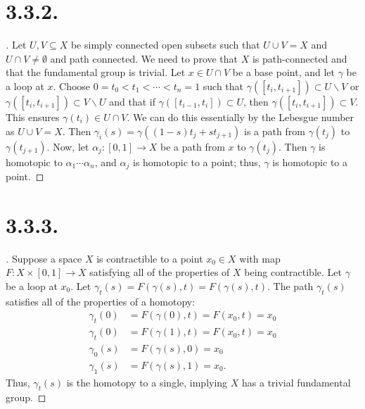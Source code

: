 \documentclass{article}
\begin{document}
\section*{3.3.2.}
\begin{proof}[\unskip\nopunct]
   Let $U, V \subseteq X$ be simply connected open subsets such that $U \cup V = X$ and $U \cap V \neq \emptyset$ 
   and path connected. We need to prove that $X$ is 
   path-connected and that the fundamental group is trivial. Let $x \in U \cap V$ be a base point, and let $\gamma$ be a loop at $x$. Choose $0 = t_0 < t_1 < \cdots < 
   t_n =1$ such that $\gamma([t_i, t_{i + 1}]) \subset U 
   \backslash V$ or $\gamma([t_i, t_{i + 1}]) \subset V 
   \backslash U$ and that if $\gamma([t_{i - 1}, t_i]) \subset U$, then $\gamma([t_i, t_{i + 1}]) \subset V$. 
   This ensures $\gamma(t_i) \in U \cap V$. We can do this essentially by the Lebesgue number as $U \cup V = X$. 
    Then $\gamma_i(s) = \gamma((1 -s)t_j + st_{j + 1})$ is a path from $\gamma(t_j)$ to $\gamma(t_{j + 1})$.
    Now, let $\alpha_j:[0, 1] \to X$ be a path from $x$ to $\gamma(t_j)$. 
    Then $\gamma$ is homotopic to $\alpha_1 \cdots \alpha_n$, and $\alpha_j$ is homotopic to a point; thus, $\gamma$ is homotopic to a point. 
\end{proof}

\section*{3.3.3.}
\begin{proof}[\unskip\nopunct]
    Suppose a space $X$ is contractible to a point $x_0 \in X$ with map $F:X \times [0, 1] \to X$ satisfying all of the properties of $X$ being contractible. Let $\gamma$ be a loop at $x_0$.
     Let $\gamma_t(s) = F(\gamma(s), t) = F(\gamma(s), t)$. 
     The path $\gamma_t(s)$ satisfies all of the properties of a homotopy:
     \begin{align*}
        \gamma_t(0) &= F(\gamma(0), t) = F(x_0, t) = x_0 \\ 
        \gamma_t(0) &= F(\gamma(1), t) = F(x_0, t) = x_0 \\
        \gamma_0(s) &= F(\gamma(s), 0) = x_0 \\
        \gamma_1(s) &= F(\gamma(s), 1) = x_0. 
     \end{align*}
     Thus, $\gamma_t(s)$ is the homotopy to a single, implying $X$ has a trivial fundamental group.
\end{proof}
\end{document}
